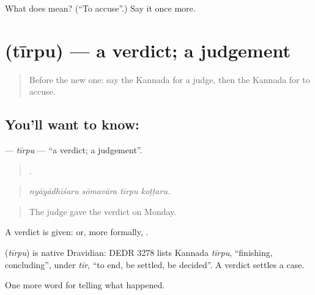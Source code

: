 \begin{tcolorbox}[breakable,colback=teal!4,colframe=teal!35!black,title={Before you move on}]
What does  mean? (\textquotedblleft{}To accuse\textquotedblright{}.) Say it once more.
\end{tcolorbox}
\section[\texorpdfstring{\kn{ತೀರ್ಪು} (tīrpu)}{ತೀರ್ಪು (tīrpu)}]{ (tīrpu) — a verdict; a judgement}

\label{lesson:KA-C321-tirpu}



\begin{quote}
Before the new one: say the Kannada for a judge, then the Kannada for to accuse.
\end{quote}

\subsection*{You'll want to know: }
\textbf{} — \emph{tīrpu} — \textquotedblleft{}a verdict; a judgement\textquotedblright{}.

\begin{quote}
   .
\end{quote}

\begin{quote}
\emph{nyāyādhīśaru sōmavāra tīrpu koṭṭaru.}
\end{quote}

\begin{quote}
The judge gave the verdict on Monday.
\end{quote}

A verdict is given:   or, more formally,  .

\begin{cousinweb}
\textbf{} (\emph{tīrpu}) is native Dravidian: DEDR 3278 lists Kannada \emph{tīrpu}, \textquotedblleft{}finishing, concluding\textquotedblright{}, under \emph{tīr}, \textquotedblleft{}to end, be settled, be decided\textquotedblright{}. A verdict settles a case.
\end{cousinweb}

\begin{grammarlens}[title={What you've built}]
One more word for telling what happened.
\end{grammarlens}

